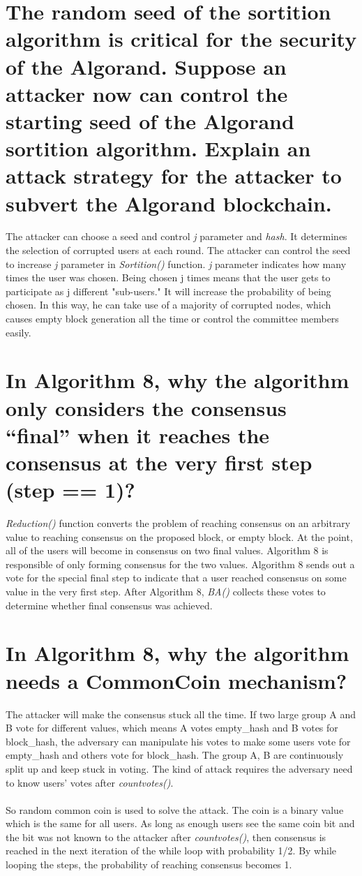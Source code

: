\documentclass{article}
\begin{document}
\section{The random seed of the sortition algorithm is critical for the security of the
Algorand. Suppose an attacker now can control the starting seed of the Algorand
sortition algorithm. Explain an attack strategy for the attacker to subvert the
Algorand blockchain.}
The attacker can choose a seed and control \textit{j} parameter and \textit{hash}. 
It determines the selection of corrupted users at each round.
The attacker can control the seed to increase \textit{j} parameter in \textit{Sortition()} function.
\textit{j} 
parameter indicates how many times the user was
chosen.
Being chosen j times means that the user gets to
participate as j different "sub-users."
It will increase the probability of being chosen.
In this way, he can take use of a majority of corrupted nodes, which causes
empty block generation all the time or control the committee members easily.
\section{In Algorithm 8, why the algorithm only considers the consensus “final” when it
reaches the consensus at the very first step (step == 1)?}
\textit{Reduction()} function converts
the problem of reaching consensus on an arbitrary value
to reaching consensus on the proposed block, or empty block. 
At the point, all of the users will become in consensus on two final values.
Algorithm 8 is responsible of only forming consensus for the two values.
Algorithm 8 sends out a vote for the special
final step to indicate that a user reached consensus on some
value in the very first step. After Algorithm 8, \textit{BA()} collects these votes
to determine whether final consensus was achieved.
\section{In Algorithm 8, why the algorithm needs a CommonCoin mechanism? }
The attacker will make the consensus stuck all the time. If two large group A and B vote for different values, which means A votes empty\_hash and B votes for block\_hash, 
the adversary can manipulate his votes to make some users vote for empty\_hash 
and others vote for block\_hash. 
The group A, B are continuously split up and keep stuck in voting.
The kind of attack requires the adversary need to 
know users' votes after \textit{countvotes()}.\\\\
So random common coin is used to solve the attack.
The coin is a binary value which is the same for all users.
As long as
enough users see the same coin bit and the bit was not
known to the attacker after \textit{countvotes()},
then consensus is reached in the next iteration of the while loop with
probability 1/2.
By while looping the steps, the probability of reaching consensus becomes 1.
\end{document}
